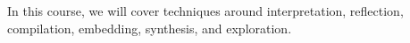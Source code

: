 In this course, we will cover techniques around interpretation,
reflection, compilation, embedding, synthesis, and exploration.

\begin{comment}
\section{Scala, Quickly}

Scala has implicit conversions. They enable promoting one type to
another, and also enable the ``pimp your library'' pattern.
\begin{lstlisting}[language=Scala]
case class Complex(r: Int, i: Int) { ... }
implicit def fromInt(r: Int) = Complex(r, 0)
\end{lstlisting}

Scala has implicit parameters. They support type classes as well as
automatically providing information based on context.
\begin{lstlisting}[language=Scala]
// type classes, e.g. Numeric[T], Ordering[T]
def foo[T:Numeric](x: T) = {
  val num = implicitly[Numeric[T]]
  num.plus(x, x)
}
// equivalently:
def foo2[T](x: T)(implicit num: Numeric[T]) {
  num.plus(x,x)
}
// for example, we could define Numeric[Complex]
implicit def numComplex: Numeric[Complex] = ...
\end{lstlisting}

Scala has case classes. They make it easy to define algebraic data types (ADTs).
Here are ADTs for the lambda calculus, and an interpreter from {\tt Term}s to {\tt Val}ues.
We can use trait mixin composition to share the {\tt Const} nodes between {\tt Term}s and {\tt Val}ues.
We use {\tt sealed} classes to get help with exhaustive pattern matching.
The {\tt @} syntax enables us to precisely name part of the pattern match.
Here, it is useful because we've been using precise types (not just the ADT union type) in some parts (for example, a closure contains a lambda).
\begin{lstlisting}[language=Scala]
sealed abstract trait Term
sealed abstract trait Val
case class Var(x: String) extends Term
case class Lam(p: Var, b: Term) extends Term
case class App(a: Term, b: Term) extends Term

type Env = Map[Var,Val]
case class Clo(l: Lam, m: Env) extends Val
case class Const(n: Int) extends Term with Val

def ev(e: Term, m: Env): Val = e match {
  case v@Var(x) => m(v)
  case c@Const(n) => c
  case l@Lam(p, b) => Clo(l, m)
  case App(a, b) => ev(a, m) match {
    case Clo(Lam(param, body), clo_env) =>
      val arg = ev(b, m)
      ev(body, clo_env + (param -> arg))
  }
}
\end{lstlisting}


\end{comment}
